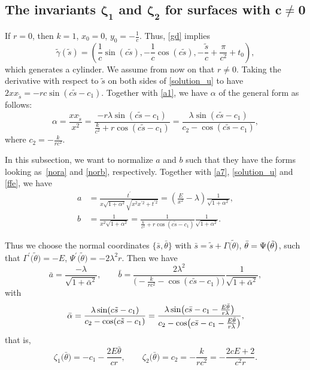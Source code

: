 \documentclass[pdftex]{sigma}
\numberwithin{equation}{section}
\begin{document}
\subsection[The invariants zeta\_1 and zeta\_2 for surfaces with c neq 0]{The invariants $\boldsymbol{\zeta_{1}}$ and $\boldsymbol{\zeta_{2}}$ for surfaces with $\boldsymbol{c\neq 0}$}
If $r=0$, then $k=1$, $x_0=0$, $y_0=-\frac{1}{c}$. Thus, \eqref{gd} implies
 \[
 \tilde\gamma(\tilde s)=\left(\frac{1}{c}\sin(c\tilde s),-\frac{1}{c}\cos(c\tilde s),-\frac{\tilde s}{c}+\frac{\pi}{c^2}+t_0\right),
 \]
 which generates a cylinder. We assume from now on that $r\neq 0$. Taking the derivative with respect to $\tilde s$ on both sides of
\eqref{solution_u} to have
$
2xx_{\tilde s}=-rc\sin(c\tilde s-c_1)$.
Together with \eqref{a1}, we have $\alpha$ of the general form as follows:
\begin{equation*}
\alpha=\frac{xx_{\tilde s}}{x^2}=\frac{-r\lambda \sin(c\tilde s-c_1)}{\frac{k}{c^2}+r\cos(c\tilde s-c_1)}=\frac{\lambda \sin(c\tilde s-c_1)}{c_2-\cos(c\tilde s-c_1)},
\end{equation*}
where $c_2=-\frac{k}{rc^2}$.

In this subsection, we want to normalize $a$ and $b$ such that they have the
forms looking as~\eqref{nora} and \eqref{norb}, respectively. Together with %
\eqref{a7}, \eqref{solution_u} and \eqref{ffe}, we have
\begin{align*}
a&=\frac{t^{\prime }}{x\sqrt{1+\alpha^2}\sqrt{x^2x^{\prime 2}+t^{\prime 2}}}=\left(\frac{E}{x^{2}}-\lambda \right)\frac{1}{\sqrt{1+\alpha^{2}}}, \\
b&=\frac{1}{x^2\sqrt{1+\alpha^2}}=\frac{1}{\frac{k}{c^2}+r\cos(c\tilde s-c_1)%
}\frac{1}{\sqrt{1+\alpha^{2}}}.
\end{align*}

Thus we choose the normal coordinates $\big\{ \bar{s},\bar{\theta}\big\}$ with
$
\bar{s}=\tilde{s}+\Gamma{\bigl(\tilde{\theta}\bigr)}$, $ \bar{\theta}=\Psi{\bigl(\tilde{%
\theta}\bigr)}$,
such that
$
\Gamma^{\prime }{\bigl(\tilde{\theta}\bigr)}=-E$, $ \Psi^{\prime }{\bigl(\tilde{\theta}\bigr)}%
=-2\lambda^{2}r$.
Then we have
\begin{equation*}
\bar{a}=\frac{-\lambda}{\sqrt{1+\bar \alpha^{2}}}, \qquad
\bar{b}=\frac{2\lambda^{2}}{\bigl(-\frac{k}{rc^2}-\cos(c\tilde s-c_1)\bigr)%
}\frac{1}{\sqrt{1+\bar \alpha^{2}}},
\end{equation*}
with
\[
\bar \alpha=\frac{\lambda \sin(c\tilde s-c_1)}{c_2-\cos(c\tilde s-c_1)}=%
\frac{\lambda \sin \bigl(c\bar s-c_1-\frac{E\bar \theta}{r\lambda}\bigr)}{%
c_2-\cos \bigl(c\bar s-c_1-\frac{E\bar \theta}{r\lambda}\bigr)},
\]
that is,
\begin{equation}\label{coinro}
\zeta_{1}\bigl(\bar \theta\bigr)=-c_1-\frac{2E\bar \theta}{cr},\qquad
\zeta_{2}\bigl(\bar \theta\bigr)=c_{2}=-\frac{k}{rc^2}=-\frac{2cE+2}{c^{2}r}.
\end{equation}
\end{document}
